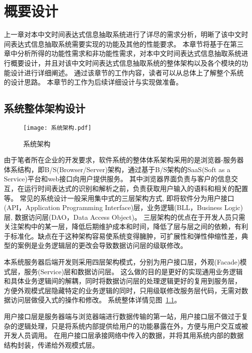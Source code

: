 

\chapter{概要设计}

上一章对本中文时间表达式信息抽取系统进行了详尽的需求分析，明晰了该中文时间表达式信息抽取系统需要实现的功能及其他的性能要求。
本章节将基于在第三章中分析所得的功能性需求和非功能性需求，对本中文时间表达式信息抽取系统进行概要设计，并且对该中文时间表达式信息抽取系统的整体架构以及各个模块的功能设计进行详细阐述。
通过该章节的工作内容，读者可以从总体上了解整个系统的设计思路。
本章节的工作为后续详细设计与实现做准备。

\section{系统整体架构设计}

\begin{figure}[h]
  \centering
  \texttt{[image: 系统架构.pdf]}
  \caption{系统架构}
  \label{fig:architect}
\end{figure}

由于笔者所在企业的开发要求，软件系统的整体体系架构采用的是浏览器-服务器体系结构，即B/S(Browser/Server)架构，通过基于B/S架构的SaaS(Soft as a Service)平台和web接口向用户提供服务。
其中浏览器界面负责与客户的信息交互，在运行时间表达式的识别和解析之前，负责获取用户输入的语料和相关的配置等。
常见的系统设计一般采用集中式的三层架构方式, 即将软件分为用户接口(API，Application Programming Interface)层，业务逻辑(BLL，Business Logic)层, 数据访问层(DAO，Data Access Object)。
三层架构的优点在于开发人员只需关注架构中的某一层，降低后期维护成本和时间，降低了层与层之间的依赖，有利于标准化。缺点在于这种架构容易使系统变得臃肿，可扩展性和弹性伸缩性差，典型的案例是业务逻辑层的更改会导致数据访问层的级联修改。

本系统服务器后端开发则采用四层架构模式，分别为用户接口层，外观(Facade)模式层，服务(Service)层和数据访问层。
这么做的目的是更好的实现通用业务逻辑和具体业务逻辑间的解耦，同时将数据访问层的处理逻辑更好的复用到服务层，
方便外观模式层隐藏特定的业务逻辑的同时，只用级联修改服务层代码，无需对数据访问层做侵入式的操作和修改。
系统整体详情见图~\ref{fig:architect}。

用户接口层是服务器端与浏览器端进行数据传输的第一站，用户接口层不做过于复杂的逻辑处理，只是将系统内部提供给用户的功能暴露在外，方便与用户交互或被开发人员调用。
在用户接口层承接网络中传入的数据，并将其用系统内部的数据结构封装，传递给外观模式层。

